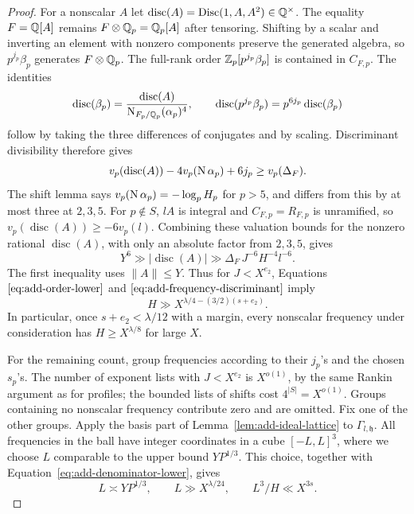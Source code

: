 \begin{proof}
For a nonscalar \(A\) let
\(\operatorname{disc}(A)=\operatorname{Disc}(1,A,A^2)\in\mathbb Q^\times\).
The equality \(F=\mathbb Q[A]\) remains
\(F\otimes\mathbb Q_p=\mathbb Q_p[A]\) after tensoring.  Shifting by a scalar and
inverting an element with nonzero components preserve the generated
algebra, so \(p^{j_p}\beta_p\) generates \(F\otimes\mathbb Q_p\).
The full-rank order \(\mathbb Z_p[p^{j_p}\beta_p]\) is contained in \(C_{F,p}\).
The identities
\[
 \operatorname{disc}(\beta_p)
   =\frac{\operatorname{disc}(A)}
          {\operatorname{N}_{F_p/\mathbb Q_p}(\alpha_p)^4},
 \qquad
 \operatorname{disc}(p^{j_p}\beta_p)
   =p^{6j_p}\operatorname{disc}(\beta_p)
\]
follow by taking the three differences of conjugates and by scaling.
Discriminant divisibility therefore gives
\[
 v_p(\operatorname{disc}(A))
  -4v_p(\operatorname{N}\alpha_p)+6j_p\ge v_p(\Delta_F).
\]
The shift lemma says \(v_p(\operatorname{N}\alpha_p)=-\log_pH_p\) for \(p>5\), and
differs from this by at most three at \(2,3,5\).
For \(p\notin S\), \(lA\) is integral and \(C_{F,p}=R_{F,p}\) is unramified,
so \(v_p(\operatorname{disc}(A))\ge-6v_p(l)\).
Combining these valuation bounds for the nonzero rational
\(\operatorname{disc}(A)\), with only an absolute factor from \(2,3,5\),
gives
\begin{equation}
 Y^6\gg |\operatorname{disc}(A)|
   \gg \Delta_F\,J^{-6}H^{-4}l^{-6}.
 \label{eq:add-frequency-discriminant}
\end{equation}
The first inequality uses \(\|A\|\le Y\).
Thus for \(J<X^{e_2}\), Equations
\(\eqref{eq:add-order-lower}\) and \(\eqref{eq:add-frequency-discriminant}\)
imply
\begin{equation}
 H\gg X^{\lambda/4-(3/2)(s+e_2)}.
 \label{eq:add-denominator-lower}
\end{equation}
In particular, once \(s+e_2<\lambda/12\) with a margin, every nonscalar
frequency under consideration has \(H\ge X^{\lambda/8}\) for large \(X\).

For the remaining count, group frequencies according to their \(j_p\)'s and
the chosen \(s_p\)'s.  The number of exponent lists with \(J<X^{e_2}\) is
\(X^{o(1)}\), by the same Rankin argument as for profiles; the bounded lists
of shifts cost \(4^{|S|}=X^{o(1)}\).  Groups containing no nonscalar
frequency contribute zero and are omitted.  Fix one of the other groups.
Apply the basis
part of Lemma~\ref{lem:add-ideal-lattice} to \(\Gamma_{l,\mathfrak h}\).
All frequencies in the ball have integer coordinates in a cube
\([-L,L]^3\), where we choose \(L\) comparable to the upper bound
\(YP^{1/3}\).  This choice, together with
Equation~\eqref{eq:add-denominator-lower}, gives
\begin{equation}
 L\asymp YP^{1/3},\qquad
 L\gg X^{\lambda/24},\qquad
 L^3/H\ll X^{3s}.
 \label{eq:add-coordinate-cube}
\end{equation}


\end{proof}
